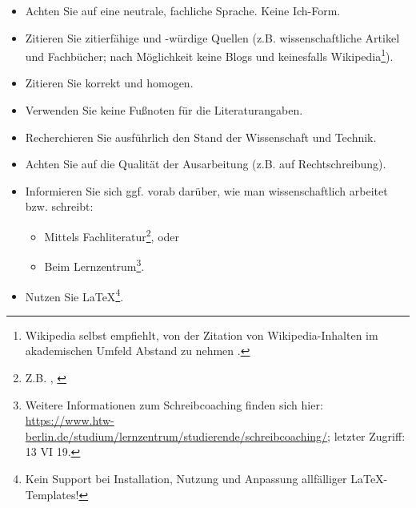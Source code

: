 \begin{itemize}
\item Achten Sie auf eine neutrale, fachliche Sprache. Keine \glqq{}Ich\grqq{}-Form.
\item Zitieren Sie zitierf\"ahige und -w\"urdige Quellen (z.B. wissenschaftliche Artikel und Fachb\"ucher; nach M\"oglichkeit keine Blogs und keinesfalls Wikipedia\footnote{Wikipedia selbst empfiehlt, von der Zitation von Wikipedia-Inhalten im akademischen Umfeld Abstand zu nehmen \autocite{wikipedia2019}.}). 
\item Zitieren Sie korrekt und homogen.
\item Verwenden Sie keine Fu{\ss}noten f\"ur die Literaturangaben.
\item Recherchieren Sie ausf\"uhrlich den Stand der Wissenschaft und Technik.
\item Achten Sie auf die Qualit\"at der Ausarbeitung (z.B. auf Rechtschreibung).
\item Informieren Sie sich ggf. vorab dar\"uber, wie man wissenschaftlich arbeitet bzw. schreibt:
\begin{itemize}
\item Mittels Fachliteratur\footnote{Z.B. \autocite{balzert2011}, \autocite{franck2013}}, oder
\item Beim Lernzentrum\footnote{Weitere Informationen zum Schreibcoaching finden sich hier: \url{https://www.htw-berlin.de/studium/lernzentrum/studierende/schreibcoaching/}; letzter Zugriff: 13 VI 19.}.
\end{itemize}
\item Nutzen Sie \LaTeX\footnote{Kein Support bei Installation, Nutzung und Anpassung allf\"alliger \LaTeX-Templates!}.
\end{itemize}



\newpage
\thispagestyle{empty}      
\noindent

\newpage
